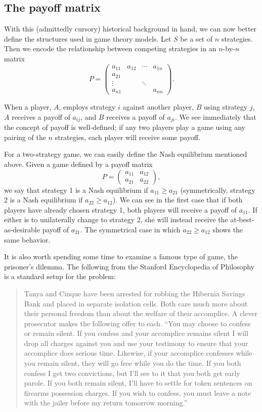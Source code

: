 \documentclass[notitlepage,reqno]{amsart}
\begin{document}
\subsection{The payoff matrix}
\label{sec:payoffmatrix}
With this (admittedly cursory) historical background in hand, we can now better define the structures used in game theory models. Let $S$ be a set of $n$ strategies. Then we encode the relationship between competing strategies in an $n$-by-$n$ matrix
\[
    P = 
    \begin{pmatrix}
      a_{11} & a_{12} & \cdots & a_{1n} \\
      a_{21} & & & \\
      \vdots & & \ddots & \\
      a_{n1} & & & a_{nn}
    \end{pmatrix}.
\]

When a player, $A$, employs strategy $i$ against another player, $B$
using strategy $j$, $A$ receives a payoff of $a_{ij}$, and $B$
receives a payoff of $a_{ji}$. We see immediately that the concept of
payoff is well-defined; if any two players play a game using any
pairing of the $n$ strategies, each player will receive some payoff.

For a two-strategy game, we can easily define the Nash equilibrium
mentioned above.  Given a game defined by a payoff matrix
\[
    P =
    \begin{pmatrix}
      a_{11} & a_{12} \\
      a_{21} & a_{22}
    \end{pmatrix},
\]
we say that strategy 1 is a Nash equilibrium if $a_{11}\geq a_{21}$ (symmetrically, strategy 2 is a Nash equilibrium if $a_{22}\geq a_{12}$). We can see in the first case that if both players have already chosen strategy 1, both players will receive a payoff of $a_{11}$. If either is to unilaterally change to strategy 2, she will instead receive the at-best-as-desirable payoff of $a_{21}$. The symmetrical case in which $a_{22}\geq a_{12}$ shows the same behavior.

It is also worth spending some time to examine a famous type of game, the prisoner's dilemma. The following from the Stanford Encyclopedia of Philosophy is a standard setup for the problem\cite{stanford}:
\begin{quote}
Tanya and Cinque have been arrested for robbing the Hibernia Savings Bank and placed in separate isolation cells. Both care much more about their personal freedom than about the welfare of their accomplice. A clever prosecutor makes the following offer to each. ``You may choose to confess or remain silent. If you confess and your accomplice remains silent I will drop all charges against you and use your testimony to ensure that your accomplice does serious time. Likewise, if your accomplice confesses while you remain silent, they will go free while you do the time. If you both confess I get two convictions, but I'll see to it that you both get early parole. If you both remain silent, I'll have to settle for token sentences on firearms possession charges. If you wish to confess, you must leave a note with the jailer before my return tomorrow morning.''
\end{quote}
\end{document}
